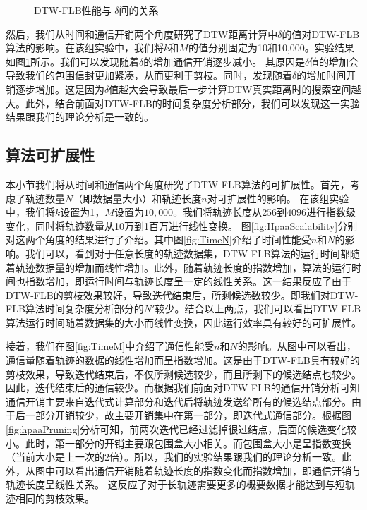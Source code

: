   \begin{figure}
  	\centering
  	\caption{DTW-FLB性能与 $\delta$间的关系}
  	\label{fig:DeltaImpact}
  \end{figure}
  
  然后，我们从时间和通信开销两个角度研究了DTW距离计算中$\delta$的值对DTW-FLB算法的影响。在该组实验中，我们将$k$和$M$的值分别固定为10和10,000。实验结果如图\ref{fig:DeltaImpact}所示。我们可以发现随着$\delta$的增加通信开销逐步减小。
  其原因是$\delta$值的增加会导致我们的包围信封更加紧凑，从而更利于剪枝。同时，发现随着$\delta$的增加时间开销逐步增加。这是因为$\delta$值越大会导致最后一步计算DTW真实距离时的搜索空间越大。此外，结合前面对DTW-FLB的时间复杂度分析部分，我们可以发现这一实验结果跟我们的理论分析是一致的。
  
 \subsection{算法可扩展性}

  本小节我们将从时间和通信两个角度研究了DTW-FLB算法的可扩展性。首先，考虑了轨迹数量$N$（即数据量大小）和轨迹长度$n$对可扩展性的影响。
  在该组实验中，我们将$k$设置为1，$M$设置为$10,000$。我们将轨迹长度从$256$到$4096$进行指数级变化，同时将轨迹数量从10万到1百万进行线性变换。
  图\ref{fig:HpaaScalability}分别对这两个角度的结果进行了介绍。其中图\ref{fig:TimeN}介绍了时间性能受$n$和$N$的影响。我们可以，看到对于任意长度的轨迹数据集，DTW-FLB算法的运行时间都随着轨迹数据量的增加而线性增加。此外，随着轨迹长度的指数增加，算法的运行时间也指数增加，即运行时间与轨迹长度呈一定的线性关系。这一结果反应了由于DTW-FLB的剪枝效果较好，导致迭代结束后，所剩候选数较少。即我们对DTW-FLB算法时间复杂度分析部分的$N'$较少。结合以上两点，我们可以看出DTW-FLB算法运行时间随着数据集的大小而线性变换，因此运行效率具有较好的可扩展性。
  
  接着，我们在图\ref{fig:TimeM}中介绍了通信性能受$n$和$N$的影响。从图中可以看出，通信量随着轨迹的数据的线性增加而呈指数增加。这是由于DTW-FLB具有较好的剪枝效果，导致迭代结束后，不仅所剩候选较少，而且所剩下的候选结点也较少。因此，迭代结束后的通信较少。而根据我们前面对DTW-FLB的通信开销分析可知通信开销主要来自迭代式计算部分和迭代后将轨迹发送给所有的候选结点部分。由于后一部分开销较少，故主要开销集中在第一部分，即迭代式通信部分。根据图\ref{fig:hpaaPruning}分析可知，前两次迭代已经过滤掉很过结点，后面的候选变化较小。此时，第一部分的开销主要跟包围盒大小相关。而包围盒大小是呈指数变换（当前大小是上一次的2倍）。所以，我们的实验结果跟我们的理论分析一致。此外，从图中可以看出通信开销随着轨迹长度的指数变化而指数增加，即通信开销与轨迹长度呈线性关系。
   这反应了对于长轨迹需要更多的概要数据才能达到与短轨迹相同的剪枝效果。

